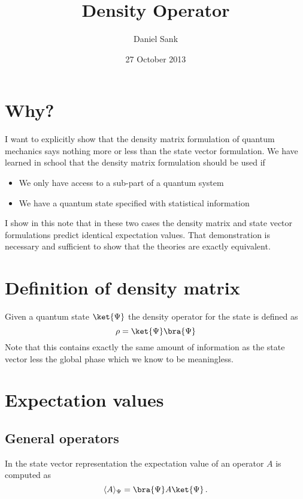 \documentclass{article}
\begin{document}
\title{Density Operator}
\author{Daniel Sank}
\date{27 October 2013}
\maketitle

\section{Why?}

I want to explicitly show that the density matrix formulation of quantum mechanics says nothing more or less than the state vector formulation. We have learned in school that the density matrix formulation should be used if

\begin{itemize}
\item We only have access to a sub-part of a quantum system
\item We have a quantum state specified with statistical information
\end{itemize}

I show in this note that in these two cases the density matrix and state vector formulations predict identical expectation values. That demonstration is necessary and sufficient to show that the theories are exactly equivalent.

\section{Definition of density matrix}

Given a quantum state $\ket{\Psi}$ the density operator for the state is defined as \begin{equation}
\rho = \ket{\Psi}\bra{\Psi} \end{equation}
Note that this contains exactly the same amount of information as the state vector less the global phase which we know to be meaningless.

\section{Expectation values}

\subsection{General operators}

In the state vector representation the expectation value of an operator $A$ is computed as \begin{equation}
\langle A \rangle_{\Psi} = \bra{\Psi}A\ket{\Psi} \, .
\end{equation}
\end{document}
